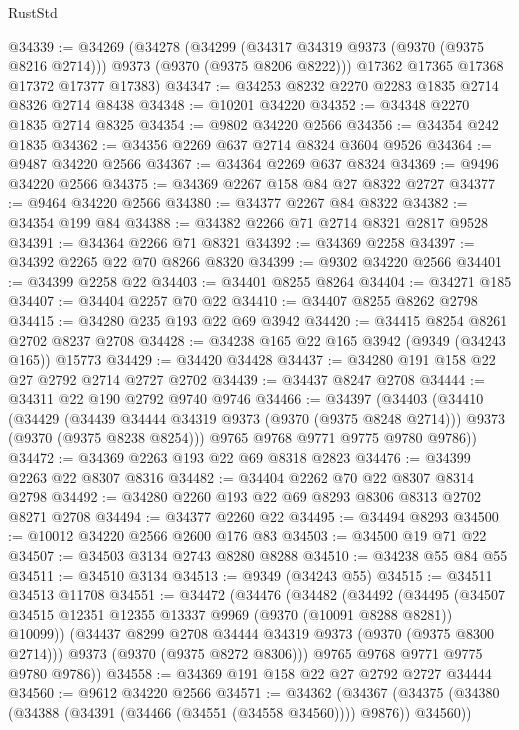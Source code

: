 \begin{lexlean}{RustStd}
\begin{coremodule}
{\begin{coremodule}
{{{{{{{{{{{{{{{{{{{{{{{{{{{{{{{{{{{{{{{@34339 := @34269
    (@34278
      (@34299 (@34317 @34319 @9373 (@9370 (@9375 @8216 @2714))) @9373 (@9370 (@9375 @8206 @8222)))
      @17362
      @17365
      @17368
      @17372
      @17377
      @17383)
@34347 := @34253 @8232 @2270 @2283 @1835 @2714 @8326 @2714 @8438
@34348 := @10201 @34220
@34352 := @34348 @2270 @1835 @2714 @8325
@34354 := @9802 @34220 @2566
@34356 := @34354 @242 @1835
@34362 := @34356 @2269 @637 @2714 @8324 @3604 @9526
@34364 := @9487 @34220 @2566
@34367 := @34364 @2269 @637 @8324
@34369 := @9496 @34220 @2566
@34375 := @34369 @2267 @158 @84 @27 @8322 @2727
@34377 := @9464 @34220 @2566
@34380 := @34377 @2267 @84 @8322
@34382 := @34354 @199 @84
@34388 := @34382 @2266 @71 @2714 @8321 @2817 @9528
@34391 := @34364 @2266 @71 @8321
@34392 := @34369 @2258
@34397 := @34392 @2265 @22 @70 @8266 @8320
@34399 := @9302 @34220 @2566
@34401 := @34399 @2258 @22
@34403 := @34401 @8255 @8264
@34404 := @34271 @185
@34407 := @34404 @2257 @70 @22
@34410 := @34407 @8255 @8262 @2798
@34415 := @34280 @235 @193 @22 @69 @3942
@34420 := @34415 @8254 @8261 @2702 @8237 @2708
@34428 := @34238 @165 @22 @165 @3942 (@9349 (@34243 @165)) @15773
@34429 := @34420 @34428
@34437 := @34280 @191 @158 @22 @27 @2792 @2714 @2727 @2702
@34439 := @34437 @8247 @2708
@34444 := @34311 @22 @190 @2792 @9740 @9746
@34466 := @34397
    (@34403
      (@34410
        (@34429
          (@34439 @34444 @34319 @9373 (@9370 (@9375 @8248 @2714)))
          @9373
          (@9370 (@9375 @8238 @8254)))
        @9765
        @9768
        @9771
        @9775
        @9780
        @9786))
@34472 := @34369 @2263 @193 @22 @69 @8318 @2823
@34476 := @34399 @2263 @22 @8307 @8316
@34482 := @34404 @2262 @70 @22 @8307 @8314 @2798
@34492 := @34280 @2260 @193 @22 @69 @8293 @8306 @8313 @2702 @8271 @2708
@34494 := @34377 @2260 @22
@34495 := @34494 @8293
@34500 := @10012 @34220 @2566 @2600 @176 @83
@34503 := @34500 @19 @71 @22
@34507 := @34503 @3134 @2743 @8280 @8288
@34510 := @34238 @55 @84 @55
@34511 := @34510 @3134
@34513 := @9349 (@34243 @55)
@34515 := @34511 @34513 @11708
@34551 := @34472
    (@34476
      (@34482
        (@34492
          (@34495 (@34507 @34515 @12351 @12355 @13337 @9969 (@9370 (@10091 @8288 @8281)) @10099))
          (@34437 @8299 @2708 @34444 @34319 @9373 (@9370 (@9375 @8300 @2714)))
          @9373
          (@9370 (@9375 @8272 @8306)))
        @9765
        @9768
        @9771
        @9775
        @9780
        @9786))
@34558 := @34369 @191 @158 @22 @27 @2792 @2727 @34444
@34560 := @9612 @34220 @2566
@34571 := @34362
    (@34367 (@34375 (@34380 (@34388 (@34391 (@34466 (@34551 (@34558 @34560)))) @9876)) @34560))
}}}}}}}}}}}}}}}}}}}}}}}}}}}}}}}}}}}}}}}
\end{coremodule}}
\end{coremodule}
\end{lexlean}
